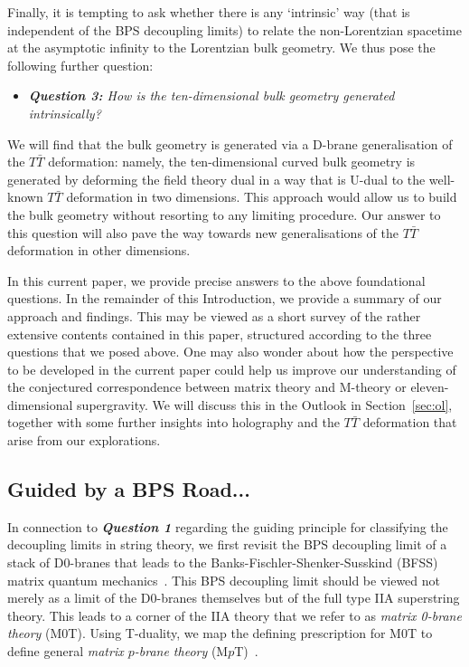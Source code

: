\documentclass[11pt]{article}
\renewcommand{\emph}[1]{\textit{#1}}
\begin{document}
Finally, it is tempting to ask whether there is any `intrinsic' way (that is independent of the BPS decoupling limits) to relate the non-Lorentzian spacetime at the asymptotic infinity to the Lorentzian bulk geometry. 
%
We thus pose the following further question:
%
\begin{itemize}

\item

\emph{\textbf{Question 3:} How is the ten-dimensional bulk geometry generated intrinsically?} 
    
\end{itemize}
%
We will find that the bulk geometry is generated via a D-brane generalisation of the $T\bar{T}$ deformation: namely, the ten-dimensional curved bulk geometry is generated by deforming the field theory dual in a way that is U-dual to the well-known $T\bar{T}$ deformation \cite{Zamolodchikov:2004ce,Smirnov:2016lqw} in two dimensions. 
%
This approach would allow us to build the bulk geometry without resorting to any limiting procedure.
Our answer to this question will also pave the way towards new generalisations of the $T\bar{T}$ deformation in other dimensions. 

In this current paper, we provide precise answers to the above foundational questions. 
In the remainder of this Introduction, we provide a summary of our approach and findings. This may be viewed as a short survey of the rather extensive contents contained in this paper, structured according to the three questions that we posed above. 
One may also wonder about how the perspective to be developed in the current paper could help us improve our understanding of the conjectured correspondence between matrix theory and M-theory or eleven-dimensional supergravity. We will discuss this in the Outlook in Section~\ref{sec:ol}, together with some further insights into holography and the $T\bar{T}$ deformation that arise from our explorations. 





\subsection{Guided by a BPS Road...}

In connection to \emph{\textbf{Question 1}} regarding the guiding principle for classifying the decoupling limits in string theory, we first revisit the BPS decoupling limit of a stack of D0-branes that leads to the 
Banks-Fischler-Shenker-Susskind (BFSS) matrix quantum mechanics~\cite{deWit:1988wri, Banks:1996vh,Susskind:1997cw}.
This BPS decoupling limit should be viewed not merely as a limit of the D0-branes themselves but of the full type IIA superstring theory.
This leads to a corner of the IIA theory that we refer to as \emph{matrix 0-brane theory} (M0T). Using T-duality, we map the defining prescription for M0T to define general \emph{matrix $p$-brane theory} (M$p$T)~\cite{Blair:2023noj, Gomis:2023eav}.  
\end{document}
